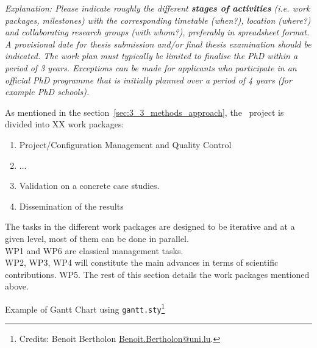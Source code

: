 % 

\emph{Explanation:
  Please indicate roughly the different \textbf{stages of activities} (i.e. work
  packages, milestones) with the corresponding timetable (when?), location
  (where?) and collaborating research groups (with whom?), preferably in
  spreadsheet format. A provisional date for thesis submission and/or final
  thesis examination should be indicated. 	
  The work plan must typically be limited to finalise the PhD within a period of
  3 years. Exceptions can be made for applicants who participate in an official
  PhD programme that is initially planned over a period of 4 years (for example
  PhD schools). 
}

As mentioned in the section~\ref{sec:3_3_methods_approach}, the \project\ project is divided into
XX work packages:
\begin{enumerate}
  \item Project/Configuration Management and Quality Control
  \item ...
  \item Validation on a concrete case studies.
  \item Dissemination of the results
\end{enumerate}

\noindent
The tasks in the different work packages are designed to be iterative and at a
given level, most of them can be done in parallel.
\\
WP1 and WP6 are classical management tasks.\\
WP2, WP3, WP4 will constitute the main advances in terms of scientific contributions.
WP5.
The rest of this section details the work packages mentioned above.




Example of Gantt Chart using \texttt{gantt.sty}\footnote{Credits: Benoit
  Bertholon \url{Benoit.Bertholon@uni.lu}.}

